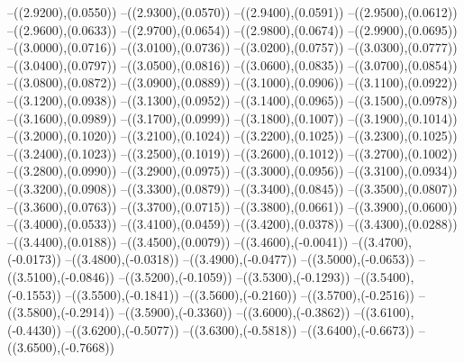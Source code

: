 {	--({\sx*(2.9200)},{\sy*(0.0550)})
	--({\sx*(2.9300)},{\sy*(0.0570)})
	--({\sx*(2.9400)},{\sy*(0.0591)})
	--({\sx*(2.9500)},{\sy*(0.0612)})
	--({\sx*(2.9600)},{\sy*(0.0633)})
	--({\sx*(2.9700)},{\sy*(0.0654)})
	--({\sx*(2.9800)},{\sy*(0.0674)})
	--({\sx*(2.9900)},{\sy*(0.0695)})
	--({\sx*(3.0000)},{\sy*(0.0716)})
	--({\sx*(3.0100)},{\sy*(0.0736)})
	--({\sx*(3.0200)},{\sy*(0.0757)})
	--({\sx*(3.0300)},{\sy*(0.0777)})
	--({\sx*(3.0400)},{\sy*(0.0797)})
	--({\sx*(3.0500)},{\sy*(0.0816)})
	--({\sx*(3.0600)},{\sy*(0.0835)})
	--({\sx*(3.0700)},{\sy*(0.0854)})
	--({\sx*(3.0800)},{\sy*(0.0872)})
	--({\sx*(3.0900)},{\sy*(0.0889)})
	--({\sx*(3.1000)},{\sy*(0.0906)})
	--({\sx*(3.1100)},{\sy*(0.0922)})
	--({\sx*(3.1200)},{\sy*(0.0938)})
	--({\sx*(3.1300)},{\sy*(0.0952)})
	--({\sx*(3.1400)},{\sy*(0.0965)})
	--({\sx*(3.1500)},{\sy*(0.0978)})
	--({\sx*(3.1600)},{\sy*(0.0989)})
	--({\sx*(3.1700)},{\sy*(0.0999)})
	--({\sx*(3.1800)},{\sy*(0.1007)})
	--({\sx*(3.1900)},{\sy*(0.1014)})
	--({\sx*(3.2000)},{\sy*(0.1020)})
	--({\sx*(3.2100)},{\sy*(0.1024)})
	--({\sx*(3.2200)},{\sy*(0.1025)})
	--({\sx*(3.2300)},{\sy*(0.1025)})
	--({\sx*(3.2400)},{\sy*(0.1023)})
	--({\sx*(3.2500)},{\sy*(0.1019)})
	--({\sx*(3.2600)},{\sy*(0.1012)})
	--({\sx*(3.2700)},{\sy*(0.1002)})
	--({\sx*(3.2800)},{\sy*(0.0990)})
	--({\sx*(3.2900)},{\sy*(0.0975)})
	--({\sx*(3.3000)},{\sy*(0.0956)})
	--({\sx*(3.3100)},{\sy*(0.0934)})
	--({\sx*(3.3200)},{\sy*(0.0908)})
	--({\sx*(3.3300)},{\sy*(0.0879)})
	--({\sx*(3.3400)},{\sy*(0.0845)})
	--({\sx*(3.3500)},{\sy*(0.0807)})
	--({\sx*(3.3600)},{\sy*(0.0763)})
	--({\sx*(3.3700)},{\sy*(0.0715)})
	--({\sx*(3.3800)},{\sy*(0.0661)})
	--({\sx*(3.3900)},{\sy*(0.0600)})
	--({\sx*(3.4000)},{\sy*(0.0533)})
	--({\sx*(3.4100)},{\sy*(0.0459)})
	--({\sx*(3.4200)},{\sy*(0.0378)})
	--({\sx*(3.4300)},{\sy*(0.0288)})
	--({\sx*(3.4400)},{\sy*(0.0188)})
	--({\sx*(3.4500)},{\sy*(0.0079)})
	--({\sx*(3.4600)},{\sy*(-0.0041)})
	--({\sx*(3.4700)},{\sy*(-0.0173)})
	--({\sx*(3.4800)},{\sy*(-0.0318)})
	--({\sx*(3.4900)},{\sy*(-0.0477)})
	--({\sx*(3.5000)},{\sy*(-0.0653)})
	--({\sx*(3.5100)},{\sy*(-0.0846)})
	--({\sx*(3.5200)},{\sy*(-0.1059)})
	--({\sx*(3.5300)},{\sy*(-0.1293)})
	--({\sx*(3.5400)},{\sy*(-0.1553)})
	--({\sx*(3.5500)},{\sy*(-0.1841)})
	--({\sx*(3.5600)},{\sy*(-0.2160)})
	--({\sx*(3.5700)},{\sy*(-0.2516)})
	--({\sx*(3.5800)},{\sy*(-0.2914)})
	--({\sx*(3.5900)},{\sy*(-0.3360)})
	--({\sx*(3.6000)},{\sy*(-0.3862)})
	--({\sx*(3.6100)},{\sy*(-0.4430)})
	--({\sx*(3.6200)},{\sy*(-0.5077)})
	--({\sx*(3.6300)},{\sy*(-0.5818)})
	--({\sx*(3.6400)},{\sy*(-0.6673)})
	--({\sx*(3.6500)},{\sy*(-0.7668)})
}
